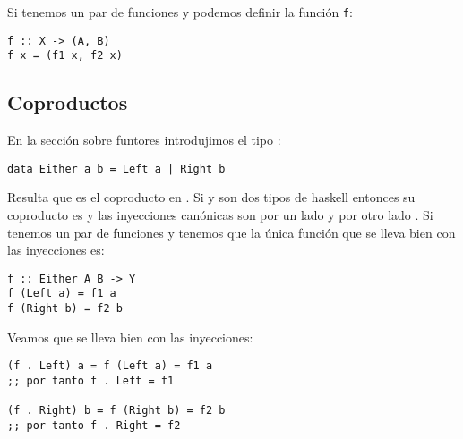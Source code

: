Si tenemos un par de funciones  y
 podemos definir la función \texttt{f}:
\begin{verbatim}
f :: X -> (A, B)
f x = (f1 x, f2 x)
\end{verbatim}

\subsection{Coproductos}
En la sección sobre funtores introdujimos el tipo :
\begin{verbatim}
data Either a b = Left a | Right b
\end{verbatim}
Resulta que  es el coproducto en . Si
 y  son dos tipos de haskell entonces su coproducto
es  y las inyecciones canónicas son por un lado
 y por otro lado
. Si tenemos un par de funciones
 y  tenemos que la única
función  que se lleva bien con las inyecciones
es:
\begin{verbatim}
f :: Either A B -> Y
f (Left a) = f1 a
f (Right b) = f2 b
\end{verbatim}

Veamos que se lleva bien con las inyecciones:
\begin{verbatim}
(f . Left) a = f (Left a) = f1 a
;; por tanto f . Left = f1

(f . Right) b = f (Right b) = f2 b
;; por tanto f . Right = f2
\end{verbatim}
